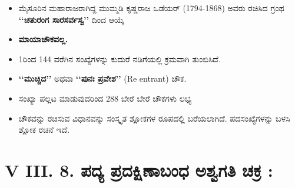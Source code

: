 \begin{itemize}
	\item ಮೈಸೂರಿನ ಮಹಾರಾಜರಾಗಿದ್ದ ಮುಮ್ಮಡಿ ಕೃಷ್ಣರಾಜ ಒಡೆಯರ್ (1794-1868) ಅವರು ರಚಿಸಿದ ಗ್ರಂಥ \textbf{‘‘ಚತುರಂಗ ಸಾರಸರ್ವಸ್ವ’’} ದಿಂದ ಆಯ್ಕೆ
	\item \textbf{ಮಾಯಾಚೌಕವಲ್ಲ.}
	\item 1ರಿಂದ 144 ವರೆಗಿನ ಸಂಖ್ಯೆಗಳನ್ನು ಕುದುರೆ ನಡಿಗೆಯಲ್ಲಿ ಕ್ರಮವಾಗಿ ತುಂಬಿಸಿದೆ.
	\item \textbf{‘‘ಮುಚ್ಚಿದ’’} ಅಥವಾ \textbf{‘‘ಪುನಃ ಪ್ರವೇಶ’’} (Re entrant) ಚೌಕ.
	\item ಸಂಖ್ಯಾ ಪಲ್ಲಟ ಮಾಡುವುದರಿಂದ 288 ಬೇರೆ ಬೇರೆ ಚೌಕಗಳು ಲಭ್ಯ
	\item ಚೌಕವನ್ನು ರಚಿಸುವ ವಿಧಾನವನ್ನು ಸಂಸ್ಕೃತ ಶ್ಲೋಕಗಳ ರೂಪದಲ್ಲಿ ಬರೆಯಲಾಗಿದೆ. ಪದಸಂಖ್ಯೆಗಳನ್ನು ಬಳಸಿ ಶ್ಲೋಕ ರಚನೆ ಇದೆ.
\end{itemize}

\section*{V III. 8. ಪದ್ಯ ಪ್ರದಕ್ಷಿಣಾಬಂಧ ಅಶ್ವಗತಿ ಚಕ್ರ :}

